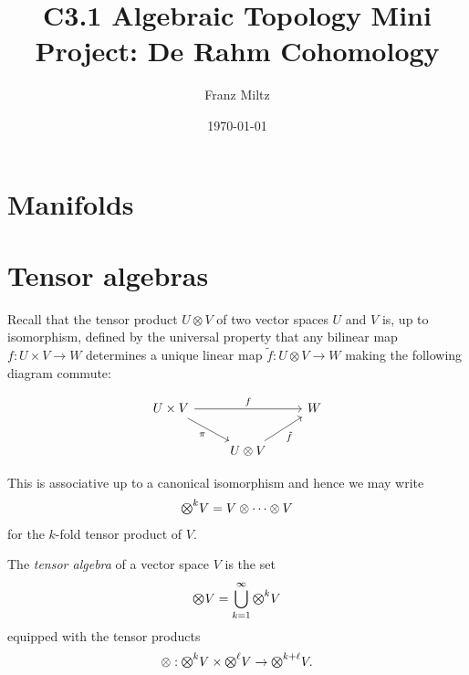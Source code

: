 \documentclass{article}
\begin{document}
\title{C3.1 Algebraic Topology Mini Project: De Rahm Cohomology}
\author{Franz Miltz}
\date{\today}
\maketitle
\tableofcontents

\section{Manifolds}

\begin{definition}
\end{definition}

\section{Tensor algebras}

Recall that the tensor product $U\otimes V$ of two vector spaces $U$ and $V$ is, up to isomorphism, defined by the universal property that any bilinear map $f:U\times V\to W$ determines a unique linear map $\tilde f : U\otimes V\to W$ making the following diagram commute:

\begin{equation*}
  \begin{tikzcd}
    {U\times V} && W \\
                & {U\otimes V}
                \arrow["f", from=1-1, to=1-3]
                \arrow["{\tilde f}"', from=2-2, to=1-3]
                \arrow["\pi"', from=1-1, to=2-2]
  \end{tikzcd}
\end{equation*}

This is associative up to a canonical isomorphism and hence we may write
\begin{align*}
  \tensor{k}{V} = V \otimes \cdots \otimes V
\end{align*}
for the $k$-fold tensor product of $V$.

\begin{definition}
  The \emph{tensor algebra} of a vector space $V$ is the set
  \begin{align*}
    \tensor{}{V} = \bigcup_{k=1}^\infty \tensor{k}{V}
  \end{align*}
  equipped with the tensor products
  \begin{align*}
    \otimes : \tensor{k}{V} \times \tensor{\ell}{V}\to \tensor{k+\ell} V.
  \end{align*}
\end{definition}
\end{document}

